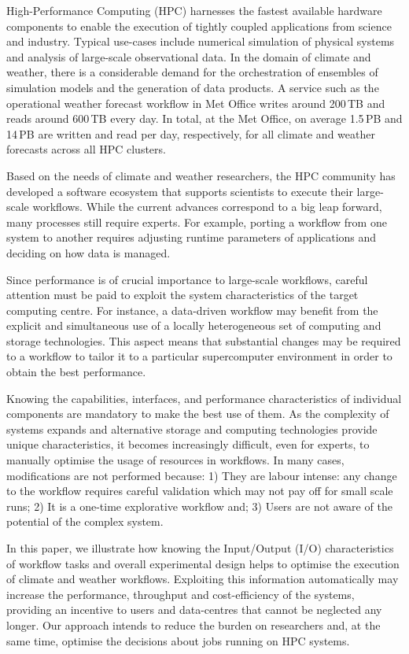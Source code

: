 \documentclass{superfri}
\begin{document}
High-Performance Computing (HPC) harnesses the fastest available hardware components to enable the execution of tightly coupled applications from science and industry.
Typical use-cases include numerical simulation of physical systems and analysis of large-scale observational data.
In the domain of climate and weather, there is a considerable demand for the orchestration of ensembles of simulation models and the generation of data products.
A service such as the operational weather forecast workflow in Met Office writes around 200\,TB and reads around 600\,TB every day.
In total, at the Met Office, on average 1.5\,PB and 14\,PB are written and read per day, respectively, for all climate and weather forecasts across all HPC clusters.

Based on the needs of climate and weather researchers, the HPC community has developed a software ecosystem that supports scientists to execute their large-scale workflows.
While the current advances correspond to a big leap forward, many processes still require experts.
For example, porting a workflow from one system to another requires adjusting runtime parameters of applications and deciding on how data is managed.

Since performance is of crucial importance to large-scale workflows, careful attention must be paid to exploit the system characteristics of the target computing centre.
For instance, a data-driven workflow may benefit from the explicit and simultaneous use of a locally heterogeneous set of computing and storage technologies.
This aspect means that substantial changes may be required to a workflow to tailor it to a particular supercomputer environment in order to obtain the best performance.

Knowing the capabilities, interfaces, and performance characteristics of individual components are mandatory to make the best use of them.
As the complexity of systems expands and alternative storage and computing technologies provide unique characteristics, it becomes increasingly difficult, even for experts, to manually optimise the usage of resources in workflows.
In many cases, modifications are not performed because: 1) They are labour intense: any change to the workflow requires careful validation which may not pay off for small scale runs; 2) It is a one-time explorative workflow and; 3) Users are not aware of the potential of the complex system.

In this paper, we illustrate how knowing the Input/Output (I/O) characteristics of workflow tasks and overall experimental design helps to optimise the execution of climate and weather workflows.
Exploiting this information automatically may increase the performance, throughput and cost-efficiency of the systems, providing an incentive to users and data-centres that cannot be neglected any longer.
Our approach intends to reduce the burden on researchers and, at the same time, optimise the decisions about jobs running on HPC systems.
\end{document}
